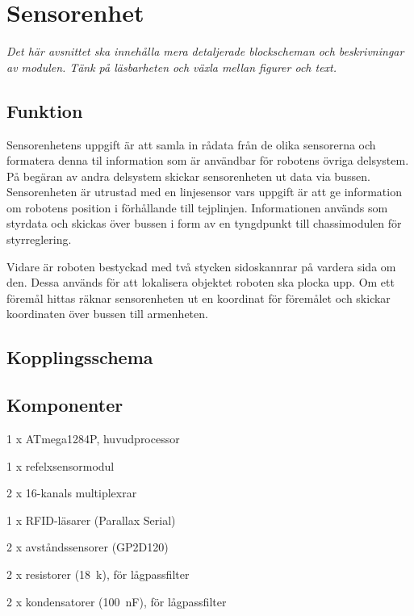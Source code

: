 \section{Sensorenhet}
\emph{Det här avsnittet ska innehålla mera detaljerade blockscheman och beskrivningar av modulen.
Tänk på läsbarheten och växla mellan figurer och text.}

\subsection{Funktion}
Sensorenhetens uppgift är att samla in rådata från de olika sensorerna och formatera denna til information som är användbar för robotens övriga delsystem. På begäran av andra delsystem skickar sensorenheten ut data via bussen. Sensorenheten är utrustad
med en linjesensor vars uppgift är att ge information om robotens position i förhållande till tejplinjen. Informationen används som styrdata och skickas över bussen i form av en tyngdpunkt till chassimodulen för styrreglering.

Vidare är roboten bestyckad med två stycken sidoskannrar på vardera sida om den. Dessa används för att lokalisera objektet roboten ska plocka upp. Om ett föremål hittas räknar sensorenheten ut en koordinat för föremålet och skickar koordinaten över bussen till armenheten.

\subsection{Kopplingsschema}

\subsection{Komponenter}
\begin{packed_itemize}
\item 1 x ATmega1284P, huvudprocessor
\item 1 x refelxsensormodul
\item 2 x 16-kanals multiplexrar
\item 1 x RFID-läsarer (Parallax Serial)
\item 2 x avståndssensorer (GP2D120)
\item 2 x resistorer (18~k\ohm), för lågpassfilter
\item 2 x kondensatorer (100~nF), för lågpassfilter
\end{packed_itemize}

